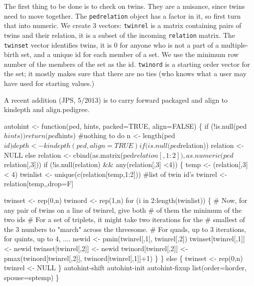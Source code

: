 \documentclass{article}
\begin{document}
\begin{enumerate}
The first thing to be done is to check on twins.  They are a nuisance, since
twins need to move together.  The {\tt{}ped{}relation} object has a factor in it, 
so first turn that into numeric.
We create 3 vectors: {\tt{}twinrel} is a matrix containing pairs of twins and
their relation, it is a subset of the incoming {\tt{}relation} matrix.
The {\tt{}twinset} vector identifies twins, it is 0 for anyone who is not a 
part of a multiple-birth set, and a unique id for each member of a set.  
We use the minimum row number of the members of the set as the id.
{\tt{}twinord} is a starting order vector for the set; it mostly makes sure
that there are no ties (who knows what a user may have used for starting 
values.)  

A recent addition (JPS, 5/2013) is to carry forward packaged and align to 
kindepth and align.pedigree.

\nwenddocs{}\endmoddef
autohint <- function(ped, hints, packed=TRUE, align=FALSE) \{
    if (!is.null(ped$hints)) return(ped$hints)  #nothing to do
    n <- length(ped$id)
    depth <- kindepth(ped, align=TRUE)

    if (is.null(ped$relation)) relation <- NULL
    else  relation <- cbind(as.matrix(ped$relation[,1:2]), 
                            as.numeric(ped$relation[,3]))
    if (!is.null(relation) && any(relation[,3] <4)) \{
        temp <- (relation[,3] < 4)
        twinlist <- unique(c(relation[temp,1:2]))  #list of twin id's 
        twinrel  <- relation[temp,,drop=F]
        
        twinset <- rep(0,n)
        twinord <- rep(1,n)
        for (i in 2:length(twinlist)) \{
            # Now, for any pair of twins on a line of twinrel, give both
            #  of them the minimum of the two ids
            # For a set of triplets, it might take two iterations for the
            #  smallest of the 3 numbers to "march" across the threesome.
            #  For quads, up to 3 iterations, for quints, up to 4, ....
            newid <- pmin(twinrel[,1], twinrel[,2])
            twinset[twinrel[,1]] <- newid
            twinset[twinrel[,2]] <- newid
            twinord[twinrel[,2]] <- pmax(twinord[twinrel[,2]], 
                                         twinord[twinrel[,1]]+1)
            \}   
        \}
    else \{
        twinset <- rep(0,n)
        twinrel <- NULL
        \}
    \LA{}autohint-shift\RA{}
    \LA{}autohint-init\RA{}
    \LA{}autohint-fixup\RA{}
    list(order=horder, spouse=sptemp)    
    \}
\nwendcode{}\nwdocspar


\end{enumerate}
\end{document}
